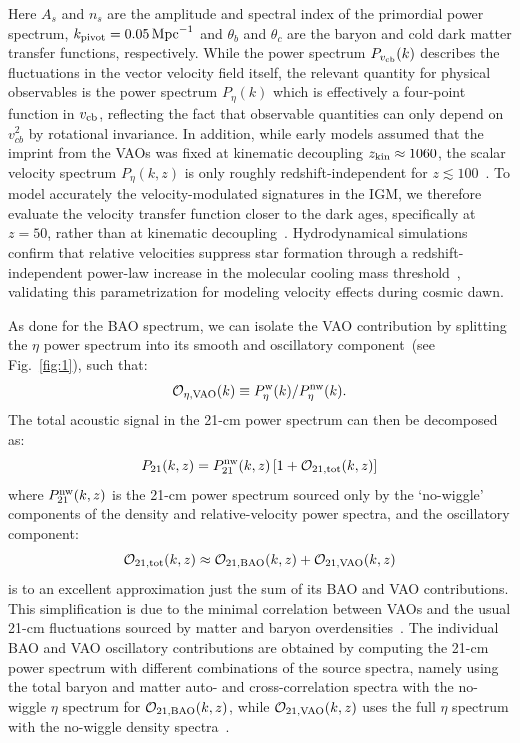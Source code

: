 \documentclass[floats,floatfix,showpacs,amssymb,prd,twocolumn,superscriptaddress,nofootinbib,reprint,preprintnumbers]{revtex4-2}
\begin{document}
Here $A_s$ and $n_s$ are the amplitude and spectral index of the primordial power spectrum, $k_{\rm pivot}=0.05\,\rm{Mpc}^{-1}$ and $\theta_b$ and $\theta_c$ are the baryon and cold dark matter transfer functions, respectively. While the power spectrum $P_{v_{\rm cb}}(k)$ describes the fluctuations in the vector velocity field itself, the relevant quantity for physical observables is the power spectrum $P_\eta(k)$ which is effectively a four-point function in $v_{\rm cb}$, reflecting the fact that observable quantities can only depend on $v_{cb}^2$ by rotational invariance. In addition, while early models assumed that the imprint from the VAOs was fixed at kinematic decoupling $z_{\rm kin}\approx 1060$, the scalar velocity spectrum $P_\eta(k,z)$ is only roughly redshift-independent for $z\lesssim 100$~\citep{ferraro12, Yoo:2011tq}. To model accurately the velocity-modulated signatures in the IGM, we therefore evaluate the velocity transfer function closer to the dark ages, specifically at $z=50$, rather than at kinematic decoupling~\cite{cruz25}. Hydrodynamical simulations confirm that relative velocities suppress star formation through a redshift-independent power-law increase in the molecular cooling mass threshold~\citep{schauer19, kulkarni21, munoz22}, validating this parametrization for modeling velocity effects during cosmic dawn.

As done for the BAO spectrum, we can isolate the VAO contribution by splitting the $\eta$ power spectrum into its smooth and oscillatory component~(see Fig.~\ref{fig:1}), such that:
\begin{equation}
    \mathcal{O}_{\eta,\rm VAO}(k)\equiv P^{\rm w}_\eta(k)/P^{\rm nw}_\eta(k).
\end{equation}
The total acoustic signal in the 21-cm power spectrum can then be decomposed as:
\begin{equation}
    P_{21}(k,z)= P_{21}^{\rm nw}(k,z)\left[1+\mathcal{O}_{21,\rm tot}(k,z)\right] \label{eq:O21_v0}
\end{equation}
where $P^{\rm nw}_{21}(k,z)$ is the 21-cm power spectrum sourced only by the `no-wiggle' components of the density and relative-velocity power spectra, and the oscillatory component:
\begin{equation}
    \mathcal{O}_{21,\rm tot}(k,z) \approx \mathcal{O}_{21,\rm BAO}(k,z)+\mathcal{O}_{21,\rm VAO}(k,z) \label{eq:O21}
\end{equation}
is to an excellent approximation just the sum of its BAO and VAO contributions. This simplification is due to the minimal correlation between VAOs and the usual 21-cm fluctuations sourced by matter and baryon overdensities~\cite{dalal10,alihaimoud14, Munoz:2018jwq}. The individual BAO and VAO oscillatory contributions are obtained  by computing the 21-cm power spectrum with different combinations of the source spectra, namely using the total baryon and matter auto- and cross-correlation spectra with the no-wiggle $\eta$ spectrum for $\mathcal{O}_{21,\rm BAO}(k,z)$, while $\mathcal{O}_{21,\rm VAO}(k,z)$ uses the full $\eta$ spectrum with the no-wiggle density spectra~\cite{cruz25}.
\end{document}
